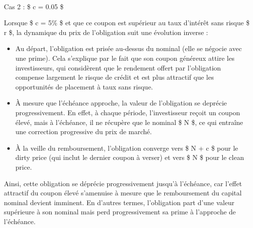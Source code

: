 \documentclass[
  letterpaper,
  DIV=11,
  numbers=noendperiod]{scrartcl}
\makeatletter
\let\oldparagraph\paragraph
\renewcommand{\paragraph}{
    \@ifstar
      \xxxParagraphStar
      \xxxParagraphNoStar
  }
\newcommand{\xxxParagraphStar}[1]{\oldparagraph*{#1}\mbox{}}
\newcommand{\xxxParagraphNoStar}[1]{\oldparagraph{#1}\mbox{}}
\providecommand{\tightlist}{%
  \setlength{\itemsep}{0pt}\setlength{\parskip}{0pt}}\usepackage{longtable,booktabs,array}
\makeatother
\begin{document}
\paragraph{Cas 2 : \$ c = 0.05 \$}\label{cas-2-c-0.05}

Lorsque \$ c = 5\% \$ et que ce coupon est supérieur au taux d'intérêt
sans risque \$ r \$, la dynamique du prix de l'obligation suit une
évolution inverse :

\begin{itemize}
\tightlist
\item
  Au départ, l'obligation est prisée au-dessus du nominal (elle se
  négocie avec une prime). Cela s'explique par le fait que son coupon
  généreux attire les investisseurs, qui considèrent que le rendement
  offert par l'obligation compense largement le risque de crédit et est
  plus attractif que les opportunités de placement à taux sans risque.\\
\item
  À mesure que l'échéance approche, la valeur de l'obligation se
  deprécie progressivement. En effet, à chaque période, l'investisseur
  reçoit un coupon élevé, mais à l'échéance, il ne récupère que le
  nominal \$ N \$, ce qui entraîne une correction progressive du prix de
  marché.\\
\item
  À la veille du remboursement, l'obligation converge vers \$ N + c \$
  pour le dirty price (qui inclut le dernier coupon à verser) et vers \$
  N \$ pour le clean price.
\end{itemize}

Ainsi, cette obligation se déprécie progressivement jusqu'à l'échéance,
car l'effet attractif du coupon élevé s'amenuise à mesure que le
remboursement du capital nominal devient imminent. En d'autres termes,
l'obligation part d'une valeur supérieure à son nominal mais perd
progressivement sa prime à l'approche de l'échéance.
\end{document}
